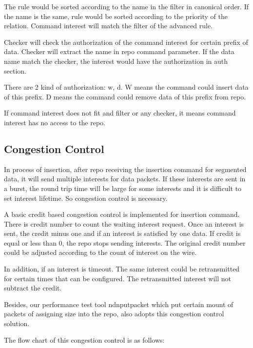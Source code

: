 \documentclass{acm_proc_article-sp}
\begin{document}
The rule would be sorted according to the name in the filter in canonical order. If the name is the same, rule would be sorted according to the priority of the relation. Command interest will match the filter of the advanced rule.

Checker will check the authorization of the command interest for certain prefix of data. Checker will extract the name in repo command parameter. If the data name match the checker, the interest would have the authorization in auth section.

There are 2 kind of authorization: w, d. W means the command could insert data of this prefix. D means the command could remove data of this prefix from repo.

If command interest does not fit and filter or any checker, it means command interest has no access to the repo.

\subsection{Congestion Control}
In process of insertion, after repo receiving the insertion command for segmented data, it will send multiple interests for data packets. If these interests are sent in a burst, the round trip time will be large for some interests and it is difficult to set interest lifetime. So congestion control is necessary.

A basic credit based congestion control is implemented for insertion command. There is credit number to count the waiting interest request. Once an interest is sent, the credit minus one and if an interest is satisfied by one data. If credit is equal or less than 0, the repo stops sending interests. The original credit number could be adjusted according to the count of interest on the wire.

In addition, if an interest is timeout. The same interest could be retransmitted for certain times that can be configured. The retransmitted interest will not subtract the credit.

Besides, our performance test tool ndnputpacket which put certain mount of packets of assigning size into the repo, also adopts this congestion control solution.

The flow chart of this congestion control is as follows:
\end{document}
